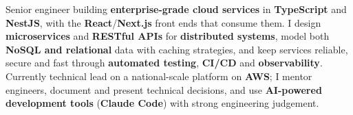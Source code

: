 
\begin{cvparagraph}
Senior engineer building \textbf{enterprise-grade cloud services} in \textbf{TypeScript} and \textbf{NestJS}, with the \textbf{React}/\textbf{Next.js} front ends that consume them. I design \textbf{microservices} and \textbf{RESTful APIs} for \textbf{distributed systems}, model both \textbf{NoSQL and relational} data with caching strategies, and keep services reliable, secure and fast through \textbf{automated testing}, \textbf{CI/CD} and \textbf{observability}. Currently technical lead on a national-scale platform on \textbf{AWS}; I mentor engineers, document and present technical decisions, and use \textbf{AI-powered development tools} (\textbf{Claude Code}) with strong engineering judgement.
\end{cvparagraph}
